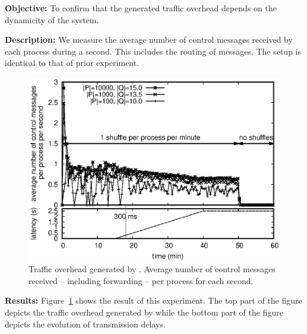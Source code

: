 \noindent \textbf{Objective:} To confirm that the generated traffic overhead
depends on the dynamicity of the system.

\noindent \textbf{Description:} We measure the average number of control
messages received by each process during a second. This includes the routing of
messages. The setup is identical to that of prior experiment.

\begin{figure}
  \begin{center}
    \includegraphics[width=0.8\columnwidth]{./img/controlmessages.eps}
    \caption{\label{fig:controlmessages}Traffic overhead generated by
      \RPCBROADCAST.  Average number of control messages received -- including
      forwarding -- per process for each second.}
  \end{center}
\end{figure}

\noindent \textbf{Results:} Figure~\ref{fig:controlmessages} shows the result of
this experiment. The top part of the figure depicts the traffic overhead
generated by \RPCBROADCAST while the bottom part of the figure depicts the
evolution of transmission delays.

